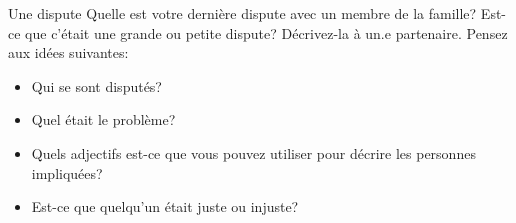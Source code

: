 \begin{frame}{Une dispute}
  Quelle est votre dernière dispute avec un membre de la famille?
  Est-ce que c'était une grande ou petite dispute?
  Décrivez-la à un.e partenaire.
  Pensez aux idées suivantes:
  \begin{itemize}
    \item Qui se sont disputés?
    \item Quel était le problème?
    \item Quels adjectifs est-ce que vous pouvez utiliser pour décrire les personnes impliquées?
    \item Est-ce que quelqu'un était juste ou injuste?
  \end{itemize}
\end{frame}